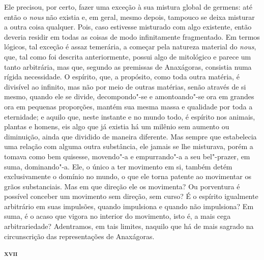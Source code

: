 Ele precisou, por certo, fazer uma exceção à sua mistura global de germens:
até então o \textit{nous} não existia e, em geral, mesmo depois, tampouco se
deixa misturar a outra coisa qualquer. Pois, caso estivesse misturado com
algo existente, então deveria residir em todas as coisas de modo
infinitamente fragmentado. Em termos lógicos, tal exceção é assaz temerária,
a começar pela natureza material do \textit{nous}, que, tal como 
foi descrita anteriormente, possui algo de mitológico e parece um tanto arbitrária, 
mas que, segundo as premissas de Anaxágoras, consistia numa rígida necessidade. 
O espírito, que, a propósito, como toda outra matéria, é divisível ao infinito, 
mas não por meio de outras matérias, senão através de si mesmo, quando ele se divide, 
decompondo"-se e amontoando"-se ora em grandes ora em pequenas proporções, mantém sua mesma
 massa e qualidade por toda a eternidade; e aquilo que, neste instante e no
 mundo todo, é espírito nos animais, plantas e homens, eis algo que já
 existia há um milênio sem aumento ou diminuição, ainda que dividido de
 maneira diferente. Mas sempre que estabelecia uma relação com alguma outra
 substância, ele jamais se lhe misturava, porém a tomava como bem quisesse,
 movendo"-a e empurrando"-a a seu bel"-prazer, em suma, dominando"-a. Ele, o
 único a ter movimento em si, também detém exclusivamente o domínio no mundo,
 o que ele torna patente ao movimentar os grãos substanciais. Mas em que
 direção ele os movimenta? Ou porventura é possível conceber um movimento sem
 direção, sem curso? É o espírito igualmente arbitrário em suas impulsões,
 quando impulsiona e quando não impulsiona? Em suma, é o acaso que vigora no
 interior do movimento, isto é, a mais cega arbitrariedade? Adentramos, em
 tais limites, naquilo que há de mais sagrado na circunscrição das
 representações de Anaxágoras. 

\bigskip
\textsc{\textbf{xvii}}
\bigskip


